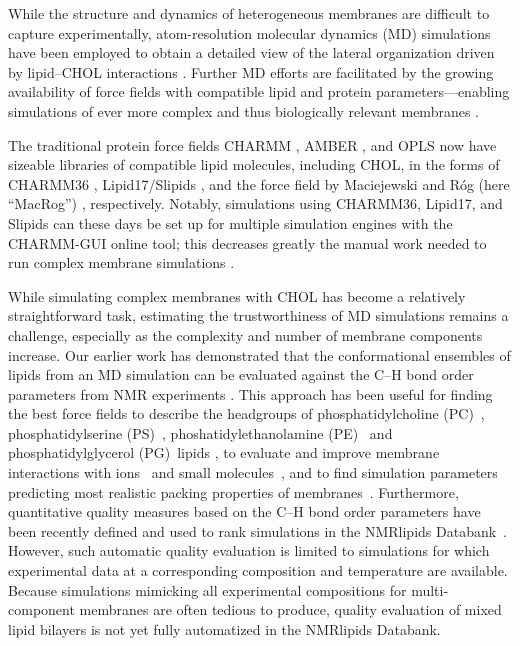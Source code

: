 \documentclass[journal=jctcce]{achemso}
\begin{document}
While the structure and dynamics of heterogeneous membranes are difficult to capture experimentally, atom-resolution molecular dynamics (MD) simulations have been employed to obtain a detailed view of the lateral organization driven by lipid--CHOL interactions \cite{rog14,rog2009ordering,berkowitz2009detailed,enkavi2019multiscale,marrink2019computational}. Further MD efforts are facilitated by the growing availability of force fields with compatible lipid and protein parameters---enabling simulations of ever more complex and thus biologically relevant membranes \cite{lorent2020plasma}. 

The traditional protein force fields CHARMM \cite{brooks1983charmm}, AMBER \cite{cornell1995second}, and OPLS \cite{jorgensen1988opls,harder2016opls3} now have sizeable libraries of compatible lipid molecules, including CHOL, in the forms of CHARMM36 \cite{Klauda06,lim12}, Lipid17/Slipids \cite{dickson14,madej15,jambeck12,jambeck12b,jambeck13b,grote2020optimization}, and the force field by Maciejewski and R\'og (here ``MacRog'') \cite{maciejewski14,kulig14,kulig15,Kulig16}, respectively. Notably, simulations using CHARMM36, Lipid17, and Slipids can these days be set up for multiple simulation engines with the CHARMM-GUI online tool; this decreases greatly the manual work needed to run complex membrane simulations \cite{lee16,lee2020charmm}. 

While simulating complex membranes with CHOL has become a relatively straightforward task, estimating the trustworthiness of MD simulations remains a challenge, especially as the complexity and number of membrane components increase. Our earlier work has demonstrated that the conformational ensembles of lipids from an MD simulation can be evaluated against the C--H bond order parameters from NMR experiments \cite{botan15,ollila16,catte2016molecular,antila2019headgroup,bacle2021inverse}. This approach has been useful for finding the best force fields to describe the headgroups of phosphatidylcholine (PC)~\cite{botan15,kurki2022structure}, phosphatidylserine (PS)~\cite{antila2019headgroup}, phoshatidylethanolamine (PE)~\cite{bacle2021inverse} and phosphatidylglycerol (PG)~lipids \cite{bacle2021inverse}, to evaluate and improve membrane interactions with ions~\cite{catte2016molecular,antila2019headgroup,bacle2021inverse,melcr18,melcr19} and small molecules~\cite{nencini22}, and to find simulation parameters predicting most realistic packing properties of membranes~\cite{antila2022emerging,NMRlipidsDatabank}. Furthermore, quantitative quality measures based on the C--H bond order parameters have been recently defined and used to rank simulations in the NMRlipids Databank~\cite{NMRlipidsDatabank}. However, such automatic quality evaluation is limited to simulations for which experimental data at a corresponding composition and temperature are available. Because simulations mimicking all experimental compositions for multi-component membranes are often tedious to produce, quality evaluation of mixed lipid bilayers is not yet fully automatized in the NMRlipids Databank. 
\end{document}
